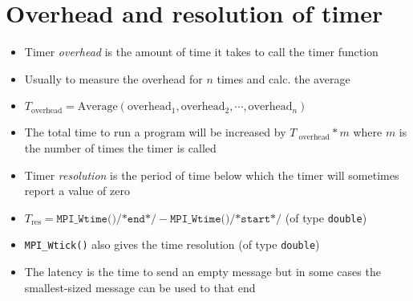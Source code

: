 \section*{Overhead and resolution of timer}
\begin{itemize}
\item Timer \emph{overhead} is the amount of time it takes to call the timer function
\item Usually to measure the overhead for $n$ times and calc. the average
\item[] $T_{\text{overhead}} = \text{Average}(\text{overhead}_1,\text{overhead}_2,\cdots,\text{overhead}_n)$
\item The total time to run a program will be increased by $T_{\text{ overhead}} * m$ where $m$ is the number of times the timer is called
\item Timer \emph{resolution} is the period of time below which the timer will sometimes report a value of zero
\item[] $T_{\text{res}} = \texttt{MPI\_Wtime()/*end*/} - \texttt{MPI\_Wtime()/*start*/}$ (of type \texttt{double})
\item \texttt{MPI\_Wtick()} also gives the time resolution (of type \texttt{double})
\item The latency is the time to send an empty message but in some cases the smallest-sized message can be used to that end
\end{itemize}
